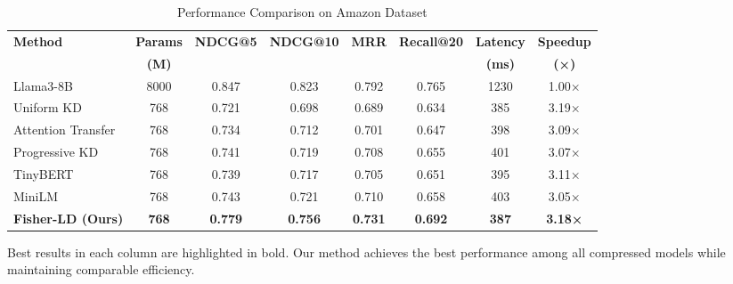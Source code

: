 \begin{table}[!t]
\centering
\caption{Performance Comparison on Amazon Dataset}
\label{tab:main_results}
\begin{tabular}{l|c|c|c|c|c|c|c}
\hline
\textbf{Method} & \textbf{Params} & \textbf{NDCG@5} & \textbf{NDCG@10} & \textbf{MRR} & \textbf{Recall@20} & \textbf{Latency} & \textbf{Speedup} \\
& \textbf{(M)} & & & & & \textbf{(ms)} & \textbf{(×)} \\
\hline
Llama3-8B & 8000 & 0.847 & 0.823 & 0.792 & 0.765 & 1230 & 1.00× \\
\hline
Uniform KD & 768 & 0.721 & 0.698 & 0.689 & 0.634 & 385 & 3.19× \\
Attention Transfer & 768 & 0.734 & 0.712 & 0.701 & 0.647 & 398 & 3.09× \\
Progressive KD & 768 & 0.741 & 0.719 & 0.708 & 0.655 & 401 & 3.07× \\
TinyBERT & 768 & 0.739 & 0.717 & 0.705 & 0.651 & 395 & 3.11× \\
MiniLM & 768 & 0.743 & 0.721 & 0.710 & 0.658 & 403 & 3.05× \\
\hline
\textbf{Fisher-LD (Ours)} & \textbf{768} & \textbf{0.779} & \textbf{0.756} & \textbf{0.731} & \textbf{0.692} & \textbf{387} & \textbf{3.18×} \\
\hline
\end{tabular}
\vspace{-2mm}
\footnotesize{Best results in each column are highlighted in bold. Our method achieves the best performance among all compressed models while maintaining comparable efficiency.}
\end{table}
